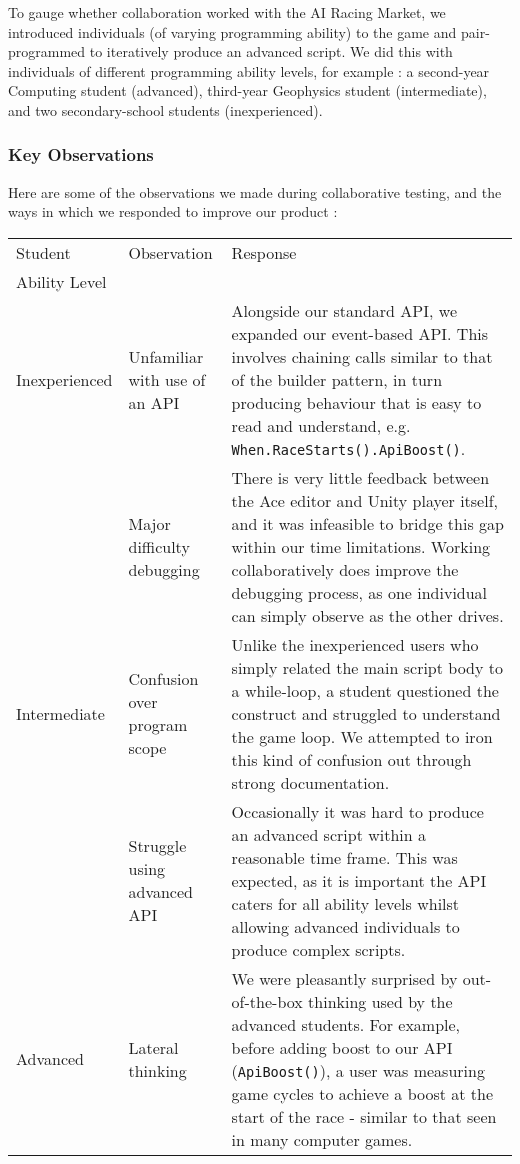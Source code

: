 To gauge whether collaboration worked with the AI Racing Market, we introduced individuals (of varying programming ability) to the game and pair-programmed to iteratively produce an advanced script. We did this with individuals of different programming ability levels, for example : a second-year Computing student (advanced), third-year Geophysics student (intermediate), and two secondary-school students (inexperienced). 

\subsubsection{Key Observations}

Here are some of the observations we made during collaborative testing, and the ways in which we responded to improve our product : \\

\begin{tabularx}{\textwidth}{ | X | X | p{} |}
\hline
Student & Observation & Response\\
Ability Level & & \\
\hline\hline
Inexperienced 
& Unfamiliar with use of an API 
	& Alongside our standard API, we expanded our event-based API. This involves chaining calls similar to that of the builder pattern, in turn producing behaviour that is easy to read and understand, e.g. {\tt When.RaceStarts().ApiBoost()}. \\ \cline{2-3}
& Major difficulty debugging 
	& There is very little feedback between the Ace editor and Unity player itself, and it was infeasible to bridge this gap within our time limitations. Working collaboratively does improve the debugging process, as one individual can simply observe as the other drives.\\  \hline
Intermediate 
& Confusion over program scope 
	& Unlike the inexperienced users who simply related the main script body to a while-loop, a student questioned the construct and struggled to understand the game loop. We attempted to iron this kind of confusion out through strong documentation. \\ \cline{2-3}
& Struggle using advanced API 
	& Occasionally it was hard to produce an advanced script within a reasonable time frame. This was expected, as it is important the API caters for all ability levels whilst allowing advanced individuals to produce complex scripts.\\ \hline
Advanced 
& Lateral thinking 
	& We were pleasantly surprised by out-of-the-box thinking used by the advanced students. For example, before adding boost to our API ({\tt ApiBoost()}), a user was measuring game cycles to achieve a boost at the start of the race - similar to that seen in many computer games.  \\
\hline
\end{tabularx}

